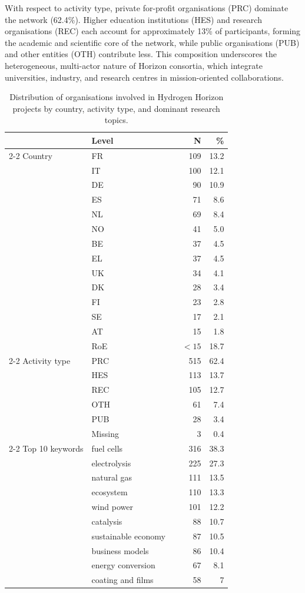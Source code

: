 \documentclass[11pt]{article}
\begin{document}
With respect to activity type, private for-profit organisations (PRC) dominate the network (62.4\%). Higher education institutions (HES) and research organisations (REC) each account for approximately 13\% of participants, forming the academic and scientific core of the network, while public organisations (PUB) and other entities (OTH) contribute less. This composition underscores the heterogeneous, multi-actor nature of Horizon consortia, which integrate universities, industry, and research centres in mission-oriented collaborations. 

\begin{table}[bt]
\centering
\caption{Distribution of organisations involved in Hydrogen Horizon projects by country, activity type, and dominant research topics.}
\begin{tabular}{llrrr}
  \toprule
   & Level &   & N & \% \\ 
    \cmidrule{2-2} \cmidrule{4-5} 
 Country &  FR &  & 109 & 13.2 \\
& IT &  & 100 & 12.1 \\
& DE &  &  90 & 10.9 \\
& ES &  &  71 &  8.6 \\
& NL &  &  69 &  8.4 \\
& NO &  &  41 &  5.0 \\
& BE &  &  37 &  4.5 \\
& EL &  &  37 &  4.5 \\
& UK &  &  34 &  4.1 \\
& DK &  &  28 &  3.4 \\
& FI &  &  23 &  2.8 \\
& SE &  &  17 &  2.1 \\
& AT &  &  15 &  1.8 \\
& RoE & & $< 15$ & 18.7 \\
     \cmidrule{2-2} \cmidrule{4-5} 
Activity type & PRC & & 515 & 62.4 \\
& HES &  & 113 & 13.7 \\
& REC &  & 105 & 12.7 \\
& OTH &  &  61 &  7.4 \\
& PUB &  &  28 &  3.4 \\
& Missing & &  3 & 0.4 \\
     \cmidrule{2-2} \cmidrule{4-5} 
Top 10 keywords & fuel cells & & 316 & 38.3 \\
& electrolysis & & 225 & 27.3 \\
& natural gas & & 111 & 13.5 \\
& ecosystem & & 110 & 13.3 \\
& wind power & & 101 & 12.2 \\
& catalysis & & 88 & 10.7 \\
& sustainable economy & & 87 & 10.5 \\
& business models & & 86 & 10.4 \\
& energy conversion & & 67 & 8.1 \\
& coating and films & & 58 & 7 \\
\hline
\end{tabular}
\label{tab:tab2}
\end{table}
\end{document}
